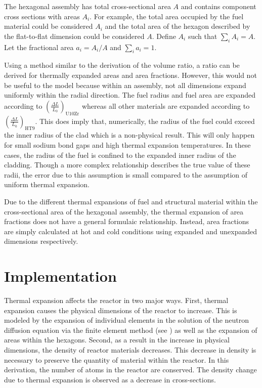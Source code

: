     The hexagonal assembly has total cross-sectional area $A$ and contains 
    component cross sections with areas $A_i$. For example, the total area 
    occupied by the fuel material could be considered $A_i$ and the total area 
    of the hexagon described by the flat-to-flat dimension could be considered 
    $A$. Define $A_i$ such that $\sum_{i} A_i = A$. Let the fractional area 
    $a_i = A_i/A$ and $\sum_{i} a_i = 1$.

    Using a method similar to the derivation of the volume ratio, a ratio can be
    derived for thermally expanded areas and area fractions. However, this would
    not be useful to the model because within an assembly, not all dimensions
    expand uniformly within the radial direction.
    The fuel radius and fuel area are expanded according to 
    $\left(\frac{\Delta L}{L_0}\right)_{\text{U10Zr}}$ whereas all other 
    materials are expanded according to 
    $\left(\frac{\Delta L}{L_0}\right)_{\text{HT9}}$. This does imply that,
    numerically, the radius of the fuel could exceed the inner radius of the 
    clad which is a non-physical result. This will only happen for small sodium 
    bond gaps and high thermal expansion temperatures. In these cases, the 
    radius of the fuel is confined to the expanded inner radius of the cladding.
    Though a more complex relationship describes the true value of these radii, 
    the error due to this assumption is small compared to the assumption of 
    uniform thermal expansion.
    
    Due to the different thermal expansions of fuel and structural material 
    within the cross-sectional area of the hexagonal assembly, the thermal 
    expansion of area fractions does not have a general formulaic relationship.
    Instead, area fractions are simply calculated at hot and cold conditions
    using expanded and unexpanded dimensions respectively. 

\section{Implementation}
  Thermal expansion affects the reactor in two major ways. First, thermal 
  expansion causes the physical dimensions of the reactor to increase. This is 
  modeled by the expansion of individual elements in the solution of the neutron 
  diffusion equation via the finite element method 
  (see ) as well as the expansion of areas within the 
  hexagons. Second, as a result in the increase in physical dimensions, the 
  density of reactor materials decreases. This decrease in density is necessary
  to preserve the quantity of material within the reactor. In this derivation,
  the number of atoms in the reactor are conserved. The density change due to 
  thermal expansion is observed as a decrease in cross-sections.

